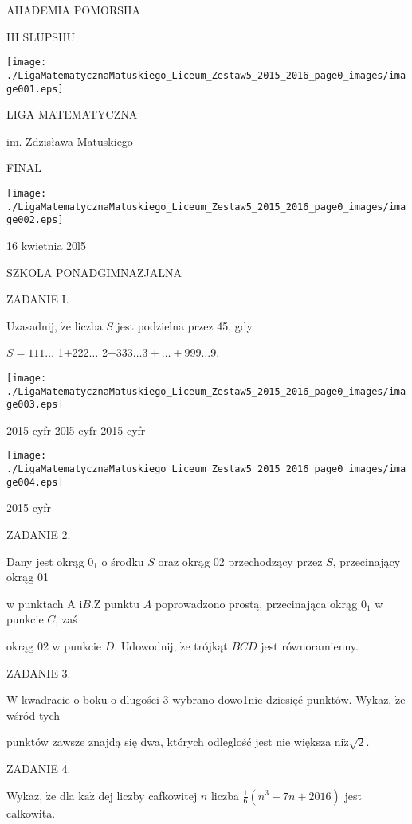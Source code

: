 \documentclass[a4paper,12pt]{article}
\begin{document}
AHADEMIA POMORSHA

III SLUPSHU
\begin{center}
\texttt{[image: ./LigaMatematycznaMatuskiego\_Liceum\_Zestaw5\_2015\_2016\_page0\_images/image001.eps]}
\end{center}
LIGA MATEMATYCZNA

im. Zdzisława Matuskiego

FINAL
\begin{center}
\texttt{[image: ./LigaMatematycznaMatuskiego\_Liceum\_Zestaw5\_2015\_2016\_page0\_images/image002.eps]}
\end{center}
16 kwietnia 20l5

SZKOLA PONADGIMNAZJALNA

ZADANIE I.

Uzasadnij, $\dot{\mathrm{z}}\mathrm{e}$ liczba $S$ jest podzielna przez 45, gdy

$ S=111\ldots$ 1$+$222$\ldots$ 2$+$333$\ldots 3+\ldots+999\ldots 9.$
\begin{center}
\texttt{[image: ./LigaMatematycznaMatuskiego\_Liceum\_Zestaw5\_2015\_2016\_page0\_images/image003.eps]}
\end{center}
2015 cyfr 20l5 cyfr  2015 cyfr
\begin{center}
\texttt{[image: ./LigaMatematycznaMatuskiego\_Liceum\_Zestaw5\_2015\_2016\_page0\_images/image004.eps]}
\end{center}
2015 cyfr

ZADANIE 2.

Dany jest okrąg $0_{1}$ o środku $S$ oraz okrąg 02 przechodzący przez $S$, przecinający okrąg 01

w punktach A $\mathrm{i}B. \mathrm{Z}$ punktu $A$ poprowadzono prostą, przecinająca okrąg $0_{1}$ w punkcie $C$, zaś

okrąg 02 w punkcie $D$. Udowodnij, $\dot{\mathrm{z}}\mathrm{e}$ trójkąt $BCD$ jest równoramienny.

ZADANIE 3.

$\mathrm{W}$ kwadracie o boku o dlugości 3 wybrano dowo1nie dziesięć punktów. Wykaz, $\dot{\mathrm{z}}\mathrm{e}$ wśród tych

punktów zawsze znajdą się dwa, których odleglość jest nie większa $\mathrm{n}\mathrm{i}\dot{\mathrm{z}}\sqrt{2}.$

ZADANIE 4.

Wykaz, $\dot{\mathrm{z}}\mathrm{e}$ dla $\mathrm{k}\mathrm{a}\dot{\mathrm{z}}$ dej liczby cafkowitej $n$ liczba $\displaystyle \frac{1}{6}(n^{3}-7n+2016)$ jest calkowita.
\end{document}
